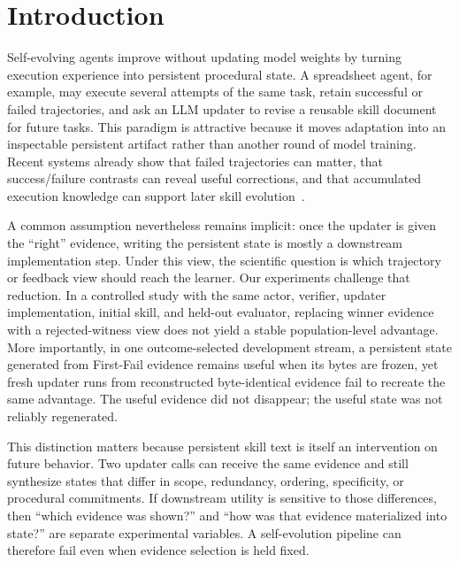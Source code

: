 \section{Introduction}

Self-evolving agents improve without updating model weights by turning execution experience into persistent procedural state. A spreadsheet agent, for example, may execute several attempts of the same task, retain successful or failed trajectories, and ask an LLM updater to revise a reusable skill document for future tasks. This paradigm is attractive because it moves adaptation into an inspectable persistent artifact rather than another round of model training. Recent systems already show that failed trajectories can matter, that success/failure contrasts can reveal useful corrections, and that accumulated execution knowledge can support later skill evolution~\citep{liu2026rethinkskill,chen2026skillcat,liu2026skillrevise,tang2026wikiskill}.

A common assumption nevertheless remains implicit: once the updater is given the ``right'' evidence, writing the persistent state is mostly a downstream implementation step. Under this view, the scientific question is which trajectory or feedback view should reach the learner. Our experiments challenge that reduction. In a controlled study with the same actor, verifier, updater implementation, initial skill, and held-out evaluator, replacing winner evidence with a rejected-witness view does not yield a stable population-level advantage. More importantly, in one outcome-selected development stream, a persistent state generated from First-Fail evidence remains useful when its bytes are frozen, yet fresh updater runs from reconstructed byte-identical evidence fail to recreate the same advantage. The useful evidence did not disappear; the useful state was not reliably regenerated.

This distinction matters because persistent skill text is itself an intervention on future behavior. Two updater calls can receive the same evidence and still synthesize states that differ in scope, redundancy, ordering, specificity, or procedural commitments. If downstream utility is sensitive to those differences, then ``which evidence was shown?'' and ``how was that evidence materialized into state?'' are separate experimental variables. A self-evolution pipeline can therefore fail even when evidence selection is held fixed.

